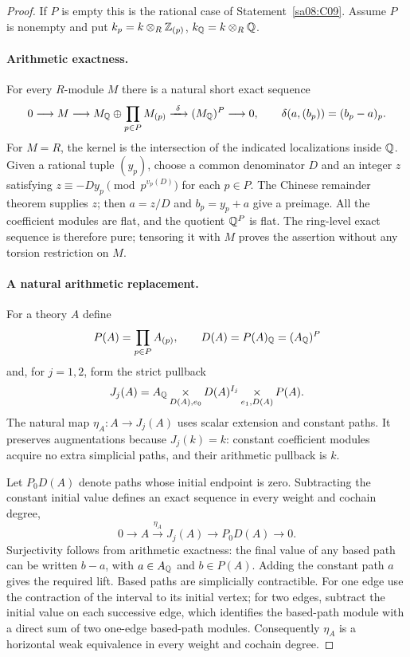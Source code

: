 \begin{proof}
If $P$ is empty this is the rational case of
Statement~\ref{sa08:C09}. Assume $P$ is nonempty and put
$k_p=k\otimes_R\mathbb Z_{(p)}$, $k_{\mathbb Q}=k\otimes_R\mathbb Q$.

\paragraph{Arithmetic exactness.}
For every $R$-module $M$ there is a natural short exact sequence
\[
 0\longrightarrow M\longrightarrow
 M_{\mathbb Q}\oplus\prod_{p\in P}M_{(p)}
 \xrightarrow{\ \delta\ }(M_{\mathbb Q})^P\longrightarrow0,
 \qquad \delta(a,(b_p))=(b_p-a)_p.
\]
For $M=R$, the kernel is the intersection of the indicated
localizations inside $\mathbb Q$. Given a rational tuple $(y_p)$, choose
a common denominator $D$ and an integer $z$ satisfying
$z\equiv-Dy_p\pmod{p^{v_p(D)}}$ for each $p\in P$.
The Chinese remainder theorem supplies $z$; then $a=z/D$ and
$b_p=y_p+a$ give a preimage. All the coefficient modules are flat,
and the quotient $\mathbb Q^P$ is flat. The ring-level exact sequence is
therefore pure; tensoring it with $M$ proves the assertion without
any torsion restriction on $M$.

\paragraph{A natural arithmetic replacement.}
For a theory $A$ define
\[
 P(A)=\prod_{p\in P}A_{(p)},\qquad
 D(A)=P(A)_{\mathbb Q}=(A_{\mathbb Q})^P
\]
and, for $j=1,2$, form the strict pullback
\[
 J_j(A)=A_{\mathbb Q}\mathop{\times}_{D(A),e_0}
 D(A)^{I_j}\mathop{\times}_{e_1,D(A)}P(A).
\]
The natural map $\eta_A:A\to J_j(A)$ uses scalar extension and
constant paths. It preserves augmentations because $J_j(k)=k$:
constant coefficient modules acquire no extra simplicial paths,
and their arithmetic pullback is $k$.

Let $P_0D(A)$ denote paths whose initial endpoint is zero. Subtracting
the constant initial value defines an exact sequence in every
weight and cochain degree,
\[
 0\longrightarrow A\xrightarrow{\eta_A}J_j(A)
 \longrightarrow P_0D(A)\longrightarrow0.
\]
Surjectivity follows from arithmetic exactness: the final value of
any based path can be written $b-a$, with $a\in A_{\mathbb Q}$ and
$b\in P(A)$. Adding the constant path $a$ gives the required
lift. Based paths are simplicially contractible. For one edge use
the contraction of the interval to its initial vertex; for two
edges, subtract the initial value on each successive edge, which
identifies the based-path module with a direct sum of two
one-edge based-path modules. Consequently $\eta_A$ is a horizontal
weak equivalence in every weight and cochain degree.


\end{proof}
